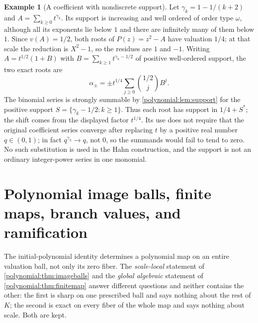 \documentclass[11pt,letterpaper]{article}
\numberwithin{equation}{section}
\theoremstyle{definition}
\newtheorem{example}[theorem]{Example}
\theoremstyle{remark}\newtheorem{remark}[theorem]{Remark}
\begin{document}
\begin{example}[A coefficient with nondiscrete support]\label{polynomial:ex:nondiscrete}
Let $\gamma_k=1-1/(k+2)$ and $A=\sum_{k\ge0}t^{\gamma_k}$. Its support is
increasing and well ordered of order type $\omega$, although all its exponents
lie below $1$ and there are infinitely many of them below $1$. Since
$v(A)=1/2$, both roots of $P(z)=z^2-A$ have valuation $1/4$; at that scale the
reduction is $X^2-1$, so the residues are $1$ and $-1$. Writing
$A=t^{1/2}(1+B)$ with $B=\sum_{k\ge1}t^{\gamma_k-1/2}$ of positive well-ordered
support, the two exact roots are
\begin{equation}\label{polynomial:eq:binomialhahn}
 \alpha_\pm=\pm t^{1/4}\sum_{j\ge0}\binom{1/2}{j}B^j .
\end{equation}
The binomial series is strongly summable by \cref{polynomial:lem:support}
for the positive support $S=\{\gamma_k-1/2:k\ge1\}$. Thus each root has
support in $1/4+S^*$; the shift comes from the displayed factor $t^{1/4}$.
Its use does not require that the original coefficient
series converge after replacing $t$ by a positive real number $q\in(0,1)$; in
fact $q^{\gamma_k}\to q$, not $0$, so the summands would fail to tend to zero.
No such substitution is used in the Hahn construction, and the support is not
an ordinary integer-power series in one monomial.
\end{example}

\section{Polynomial image balls, finite maps, branch values, and ramification}
\label{polynomial:sec:maps}
The initial-polynomial identity determines a polynomial map on an entire
valuation ball, not only its zero fiber. The \emph{scale-local} statement of
\cref{polynomial:thm:imageballs} and the \emph{global algebraic} statement of
\cref{polynomial:thm:finitemap} answer different questions and neither
contains the other: the first is sharp on one prescribed ball and says nothing
about the rest of $K$; the second is exact on every fiber of the whole map and
says nothing about scale. Both are kept.
\end{document}
